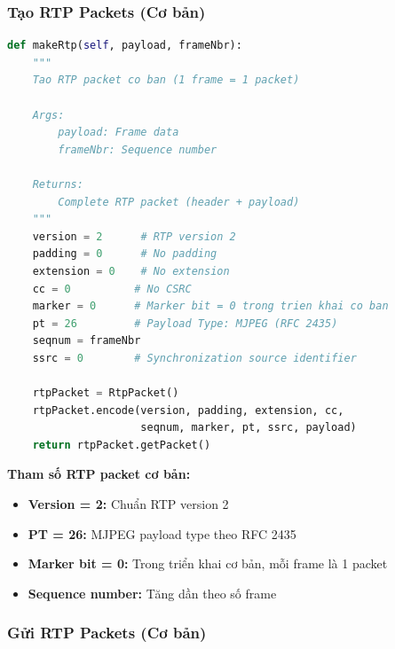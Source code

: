 \subsubsection{Tạo RTP Packets (Cơ bản)}

\begin{lstlisting}[language=Python, caption={Make RTP Packet - Basic Version}]
def makeRtp(self, payload, frameNbr):
    """
    Tao RTP packet co ban (1 frame = 1 packet)
    
    Args:
        payload: Frame data
        frameNbr: Sequence number
    
    Returns:
        Complete RTP packet (header + payload)
    """
    version = 2      # RTP version 2
    padding = 0      # No padding
    extension = 0    # No extension
    cc = 0          # No CSRC
    marker = 0      # Marker bit = 0 trong trien khai co ban
    pt = 26         # Payload Type: MJPEG (RFC 2435)
    seqnum = frameNbr
    ssrc = 0        # Synchronization source identifier
    
    rtpPacket = RtpPacket()
    rtpPacket.encode(version, padding, extension, cc, 
                     seqnum, marker, pt, ssrc, payload)
    return rtpPacket.getPacket()
\end{lstlisting}

\textbf{Tham số RTP packet cơ bản:}
\begin{itemize}
    \item \textbf{Version = 2:} Chuẩn RTP version 2
    \item \textbf{PT = 26:} MJPEG payload type theo RFC 2435
    \item \textbf{Marker bit = 0:} Trong triển khai cơ bản, mỗi frame là 1 packet
    \item \textbf{Sequence number:} Tăng dần theo số frame
\end{itemize}

\subsubsection{Gửi RTP Packets (Cơ bản)}

